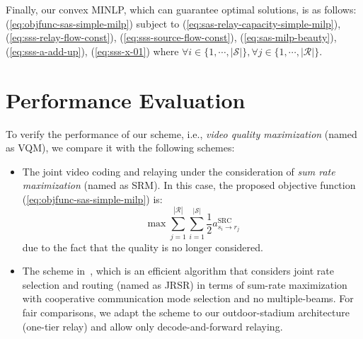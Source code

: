 \documentclass[conference]{IEEEtran}
\begin{document}
Finally, our convex MINLP, which can guarantee optimal solutions, is as follows: (\ref{eq:objfunc-sas-simple-milp}) subject to
(\ref{eq:sas-relay-capacity-simple-milp}),
(\ref{eq:sss-relay-flow-const}),
(\ref{eq:sss-source-flow-const}),
(\ref{eq:sas-milp-beauty}),
(\ref{eq:sss-a-add-up}),
(\ref{eq:sss-x-01})
where $\forall i\in\{1,\cdots,|\mathcal{S}|\}, \forall j \in \{1,\cdots,|\mathcal{R}|\}$.


\section{Performance Evaluation}\label{sec:perfeval}

To verify the performance of our scheme, i.e., \textit{video quality maximization} (named as \textsf{VQM}), we compare it with the following schemes:
\begin{itemize}
\item The joint video coding and relaying under the consideration of {\it sum rate maximization} (named as \textsf{SRM}). In this case, the proposed objective function (\ref{eq:objfunc-sas-simple-milp}) is:
\begin{equation}
\max \sum_{j=1}^{|\mathcal{R}|}\sum_{i=1}^{|\mathcal{S}|}\frac{1}{2}a_{s_{i}\rightarrow r_{j}}^{\text{SRC}}
\end{equation}
due to the fact that the quality is no longer considered.
\item The scheme in~\cite{jsac12thou}, which is an efficient algorithm that considers joint rate selection and routing (named as \textsf{JRSR}) in terms of sum-rate maximization with cooperative communication mode selection and no multiple-beams.
For fair comparisons, we adapt the scheme to our outdoor-stadium architecture (one-tier relay) and allow only decode-and-forward relaying.
\end{itemize}
\end{document}
